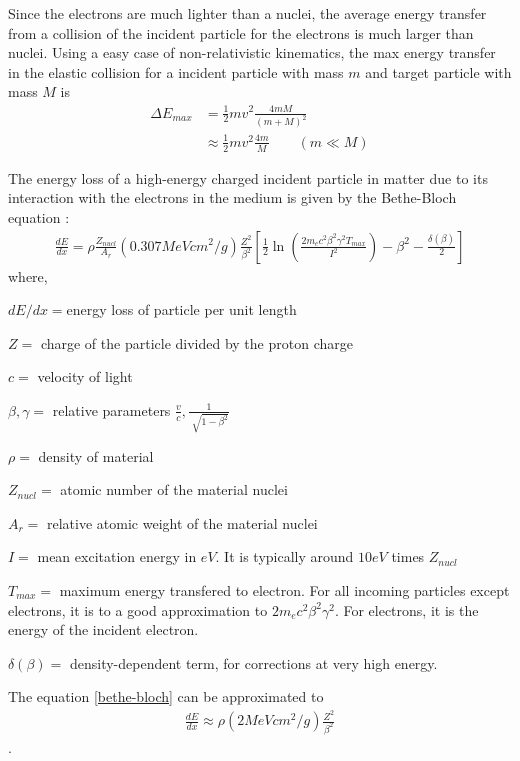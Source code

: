 Since the electrons are much lighter than a nuclei, the average energy transfer from a collision of the incident particle for the electrons is much larger than nuclei. Using a easy case of non-relativistic kinematics, the max energy transfer in the elastic collision for a incident particle with mass $m$ and target particle with mass $M$ is 
\begin{align}
\Delta E_{max} & = \frac{1}{2} m v^2 \frac{4 m M}{(m+M)^2} \\
& \approx \frac{1}{2} m v^2 \frac{4 m}{M} \qquad(m \ll M)
\end{align}

The energy loss of a high-energy charged incident particle in matter due to its interaction with the electrons in the medium is given by the Bethe-Bloch equation \cite{Tavernier2010}:
\begin{align}
\label{bethe-bloch}
\frac{dE}{dx}= \rho \frac{Z_{nucl}}{A_r}(0.307 MeV cm^2/g) \frac{Z^2}{\beta^2}[\frac{1}{2} \ln (\frac{2 m_e c^2 \beta^2 \gamma^2 T_{max}}{I^2}) - \beta^2 - \frac{\delta(\beta)}{2}]
\end{align}
where,

$dE/dx =$energy loss of particle per unit length 

$Z =$ charge of the particle divided by the proton charge

$c =$ velocity of light

$\beta, \gamma =$ relative parameters $\frac{v}{c}, \frac{1}{\sqrt[]{1-\beta^2}}$ 

$\rho =$ density of material 

$Z_{nucl} = $ atomic number of the material nuclei 

$A_r =$ relative atomic weight of the material nuclei

$I = $ mean excitation energy in $eV$. It is typically around $10eV$ times $Z_{nucl}$

$T_{max} =$ maximum energy transfered to electron. For all incoming particles except electrons, it is to a good approximation to $2 m_e c^2 \beta^2 \gamma^2$. For electrons, it is the energy of the incident electron.

$\delta(\beta) = $ density-dependent term, for corrections at very high energy.  

The equation \ref{bethe-bloch} can be approximated to 
\begin{align}
\label{bethe-bloch simple}
\frac{dE}{dx} \approx \rho (2 MeV cm^2/g) \frac{Z^2}{\beta^2}
\end{align}.

